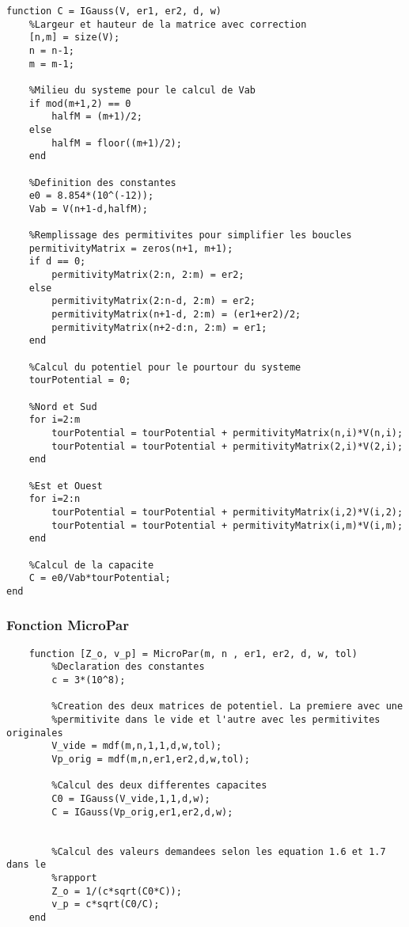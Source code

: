 \begin{lstlisting}
function C = IGauss(V, er1, er2, d, w)
    %Largeur et hauteur de la matrice avec correction
    [n,m] = size(V);
    n = n-1;
    m = m-1;
    
    %Milieu du systeme pour le calcul de Vab
    if mod(m+1,2) == 0
        halfM = (m+1)/2;
    else
        halfM = floor((m+1)/2);
    end 
    
    %Definition des constantes
    e0 = 8.854*(10^(-12));
    Vab = V(n+1-d,halfM);
    
    %Remplissage des permitivites pour simplifier les boucles
    permitivityMatrix = zeros(n+1, m+1);
    if d == 0; 
        permitivityMatrix(2:n, 2:m) = er2;
    else
        permitivityMatrix(2:n-d, 2:m) = er2;
        permitivityMatrix(n+1-d, 2:m) = (er1+er2)/2;
        permitivityMatrix(n+2-d:n, 2:m) = er1;
    end
    
    %Calcul du potentiel pour le pourtour du systeme
    tourPotential = 0;

    %Nord et Sud
    for i=2:m   
        tourPotential = tourPotential + permitivityMatrix(n,i)*V(n,i);
        tourPotential = tourPotential + permitivityMatrix(2,i)*V(2,i);
    end
    
    %Est et Ouest
    for i=2:n
        tourPotential = tourPotential + permitivityMatrix(i,2)*V(i,2);
        tourPotential = tourPotential + permitivityMatrix(i,m)*V(i,m);
    end
    
    %Calcul de la capacite
    C = e0/Vab*tourPotential; 
end
\end{lstlisting}
\subsubsection{Fonction MicroPar}
\begin{lstlisting}
	function [Z_o, v_p] = MicroPar(m, n , er1, er2, d, w, tol)
	    %Declaration des constantes
	    c = 3*(10^8);
    
	    %Creation des deux matrices de potentiel. La premiere avec une
	    %permitivite dans le vide et l'autre avec les permitivites originales
	    V_vide = mdf(m,n,1,1,d,w,tol);
	    Vp_orig = mdf(m,n,er1,er2,d,w,tol);
    
	    %Calcul des deux differentes capacites
	    C0 = IGauss(V_vide,1,1,d,w);
	    C = IGauss(Vp_orig,er1,er2,d,w);
    
    
	    %Calcul des valeurs demandees selon les equation 1.6 et 1.7 dans le
	    %rapport
	    Z_o = 1/(c*sqrt(C0*C));
	    v_p = c*sqrt(C0/C);
	end
\end{lstlisting}

